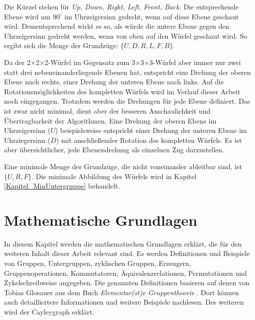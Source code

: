 \documentclass[12pt,a4paper, usenames, dvipsnames]{article}
\theoremstyle{mystyle}
\theoremstyle{definition}
\newcommand{\Ttwo}{2$\times$2$\times$2-}
\newcommand{\Tthree}{3$\times$3$\times$3-}
\begin{document}
Die Kürzel stehen für \textit{Up, Down, Right, Left, Front, Back}. 
Die entsprechende Ebene wird um $90^\circ$ im Uhrzeigersinn gedreht, wenn auf diese Ebene geschaut wird. Dementsprechend wirkt es so, als würde die untere Ebene gegen den Uhrzeigersinn gedreht werden, wenn von oben auf den Würfel geschaut wird. So ergibt sich die Menge der Grundzüge: $\{U, D, R, L, F, B\}$.


Da der \Ttwo Würfel im Gegensatz zum \Tthree Würfel aber immer nur zwei statt drei nebeneinanderliegende Ebenen hat, entspricht eine Drehung der oberen Ebene nach rechts, einer Drehung der unteren Ebene nach links. 
Auf die Rotationsmöglichkeiten des kompletten Würfels wird im Verlauf dieser Arbeit noch eingegangen. Trotzdem werden die Drehungen für jede Ebene definiert. Das ist zwar nicht minimal, dient aber der besseren Anschaulichkeit und Übertragbarkeit der Algorithmen.
Eine Drehung der oberen Ebene im Uhrzeigersinn ($U$) beispielsweise entspricht einer Drehung der unteren Ebene im Uhrziegersinn ($D$) mit anschließender Rotation des kompletten Würfels. Es ist aber übersichtlicher, jede Ebenendrehung als einzelnen Zug darzustellen. 

Eine minimale Menge der Grundzüge, die nicht voneinander ableitbar sind, ist $\{U, R, F\}$. Die minimale Abbildung des Würfels wird in Kapitel \ref{Kapitel_MinUntergruppe} behandelt.



%
%
%
%
%
%
%
%
%
%
%
%
%
%
%
%
%


\newpage
\section{Mathematische Grundlagen}

\label{Kapitel_MathematischeGrundlagen}

In diesem Kapitel werden die mathematischen Grundlagen erklärt, die für den weiteren Inhalt dieser Arbeit relevant sind. Es werden Definitionen und Beispiele von Gruppen, Untergruppen, zyklischen Gruppen, Erzeugern, Gruppenoperationen, Kommutatoren, Äquivalenzrelationen, Permutationen und Zykelschreibweise angegeben.
Die genannten Definitionen basieren auf denen von Tobias Glosauer aus dem Buch \textit{Elementar(st)e Gruppentheorie} \cite{Buch}. Dort können auch detailliertere Informationen und weitere Beispiele nachlesen.
Des weiteren wird der Cayleygraph erklärt. 
%
%
%
%
%
%
\end{document}
